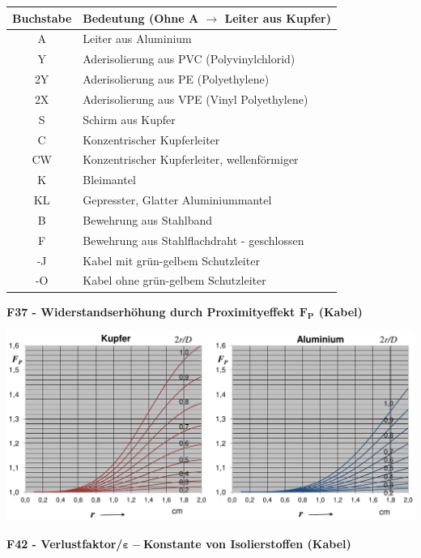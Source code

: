 {\hspace{-3em}
\begin{minipage}[c]{0.5\textwidth}
    \centering
    \begin{tabular}{|c|p{\linewidth}|}
    \hline
    Buchstabe & Bedeutung (Ohne A $\rightarrow$ Leiter aus Kupfer)\\
    \hline
    A & Leiter aus Aluminium\\
    \hline
    Y & Aderisolierung aus PVC (Polyvinylchlorid)\\
    \hline
    2Y & Aderisolierung aus PE (Polyethylene)\\
    \hline
    2X & Aderisolierung aus VPE (Vinyl Polyethylene)\\
    \hline
    S & Schirm aus Kupfer\\
    \hline
    C & Konzentrischer Kupferleiter\\
    \hline
    CW & Konzentrischer Kupferleiter, wellenförmiger\\
    \hline
    K & Bleimantel\\
    \hline
    KL & Gepresster, Glatter Aluminiummantel\\
    \hline
    B & Bewehrung aus Stahlband\\
    \hline
    F & Bewehrung aus Stahlflachdraht - geschlossen\\
    \hline
    -J & Kabel mit grün-gelbem Schutzleiter\\
    \hline
    -O & Kabel ohne grün-gelbem Schutzleiter\\
    \hline
\end{tabular}
\end{minipage}
}

\textbf{F37 - Widerstandserhöhung durch Proximityeffekt $\mathbf{F_P}$ (Kabel)}

\includegraphics[width=0.9\columnwidth]{figures/F37_Kabel_Resistanzbelag_Proximityeffekt.png}


\textbf{F42 - Verlustfaktor/$\mathbf{\varepsilon-}$Konstante von Isolierstoffen (Kabel)}

